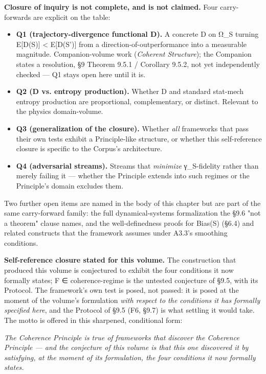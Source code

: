\documentclass[11pt, openany]{book}
\renewenvironment{quote}{\begin{quoting}}{\end{quoting}}
\begin{document}
\textbf{Closure of inquiry is not complete, and is not claimed.} Four carry-forwards are explicit on the table:

\begin{itemize}
\item \textbf{Q1 (trajectory-divergence functional D).} A concrete D on Ω\_\allowbreak{}S turning E[D(S)] < E[D(S')] from a direction-of-outperformance into a measurable magnitude. Companion-volume work (\textit{Coherent Structure}); the Companion states a resolution, §9 Theorem 9.5.1 / Corollary 9.5.2, not yet independently checked --- Q1 stays open here until it is.
\item \textbf{Q2 (D vs. entropy production).} Whether D and standard stat-mech entropy production are proportional, complementary, or distinct. Relevant to the physics domain-volume.
\item \textbf{Q3 (generalization of the closure).} Whether \textit{all} frameworks that pass their own tests exhibit a Principle-like structure, or whether this self-reference closure is specific to the Corpus's architecture.
\item \textbf{Q4 (adversarial streams).} Streams that \textit{minimize} γ\_\allowbreak{}S-fidelity rather than merely failing it --- whether the Principle extends into such regimes or the Principle's domain excludes them.
\end{itemize}

Two further open items are named in the body of this chapter but are part of the same carry-forward family: the full dynamical-systems formalization the §9.6 "not a theorem" clause names, and the well-definedness proofs for Bias(S) (§6.4) and related constructs that the framework assumes under A3.3's smoothing conditions.

\textbf{Self-reference closure stated for this volume.} The construction that produced this volume is conjectured to exhibit the four conditions it now formally states; F ∈ coherence-regime is the untested conjecture of §9.5, with its Protocol. The framework's own test is posed, not passed: it is posed at the moment of the volume's formulation \textit{with respect to the conditions it has formally specified here}, and the Protocol of §9.5 (F6, §9.7) is what settling it would take. The motto is offered in this sharpened, conditional form:

\begin{quote}
\textit{The Coherence Principle is true of frameworks that discover the Coherence Principle --- and the conjecture of this volume is that this one discovered it by satisfying, at the moment of its formulation, the four conditions it now formally states.}
\end{quote}
\end{document}
